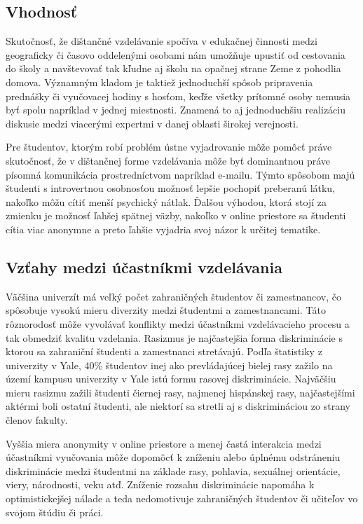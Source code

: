 \documentclass[10pt,slovak,a4paper]{article}
\begin{document}
\subsection{Vhodnosť}
	Skutočnosť, že dištančné vzdelávanie spočíva v edukačnej činnosti medzi geograficky či časovo oddelenými osobami nám umožňuje upustiť od cestovania do školy a navštevovať tak kľudne aj školu na opačnej strane Zeme z pohodlia domova. Významným kladom je taktiež jednoduchší spôsob pripravenia prednášky či vyučovacej hodiny s hosťom, keďže všetky prítomné osoby nemusia byť spolu napríklad v jednej miestnosti. Znamená to aj jednoduchšiu realizáciu diskusie medzi viacerými expertmi v danej oblasti širokej verejnosti.

	Pre študentov, ktorým robí problém ústne vyjadrovanie môže pomôcť práve skutočnosť, že v dištančnej forme vzdelávania môže byť dominantnou práve písomná komunikácia prostredníctvom napríklad e-mailu. Týmto spôsobom majú študenti s introvertnou osobnosťou možnosť lepšie pochopiť preberanú látku, nakoľko môžu cítiť menší psychický nátlak. Ďalšou výhodou, ktorá stojí za zmienku je možnosť ľahšej spätnej väzby, nakoľko v online priestore sa študenti cítia viac anonymne a preto ľahšie vyjadria svoj názor k určitej tematike.

\subsection{Vzťahy medzi účastníkmi vzdelávania}
	Väčšina univerzít má veľký počet zahraničných študentov či zamestnancov, čo spôsobuje vysokú mieru diverzity medzi študentmi a zamestnancami. Táto rôznorodosť môže vyvolávať konflikty medzi účastníkmi vzdelávacieho procesu a tak obmedziť kvalitu vzdelania. Rasizmus je najčastejšia forma diskriminácie s ktorou sa zahraniční študenti a zamestnanci stretávajú. Podľa štatistiky z univerzity v Yale, 40\% študentov inej ako prevládajúcej bielej rasy zažilo na území kampusu univerzity v Yale istú formu rasovej diskriminácie. Najväčšiu mieru rasizmu zažili študenti čiernej rasy, najmenej hispánskej rasy, najčastejšími aktérmi boli ostatní študenti, ale niektorí sa stretli aj s diskrimináciou zo strany členov fakulty.\cite{david_shimer_2015}

 	Vyššia miera anonymity v online priestore a menej častá interakcia medzi účastníkmi vyučovania môže dopomôcť k zníženiu alebo úplnému odstráneniu diskriminácie medzi študentmi na základe rasy, pohlavia, sexuálnej orientácie, viery, národnosti, veku atď. Zníženie rozsahu diskriminácie napomáha k optimistickejšej nálade a teda nedomotivuje zahraničných študentov či učiteľov vo svojom štúdiu či práci.
\end{document}
